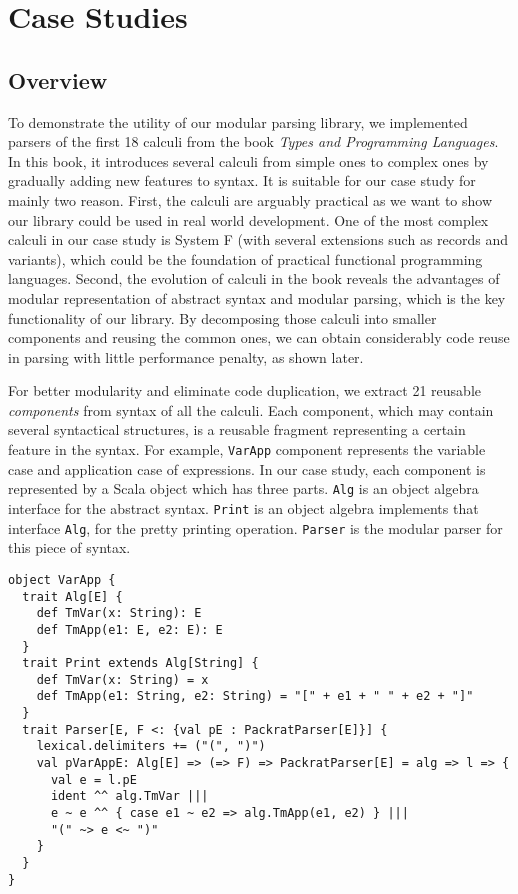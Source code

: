 \section{Case Studies}\label{sec:casestudy}

\subsection{Overview}\label{subsec:overview}

To demonstrate the utility of our modular parsing library, we implemented parsers of the first 18 calculi from the book \textit{Types and Programming Languages}. In this book, it introduces several calculi from simple ones to complex ones by gradually adding new features to syntax. It is suitable for our case study for mainly two reason. First, the calculi are arguably practical as we want to show our library could be used in real world development. One of the most complex calculi in our case study is System F (with several extensions such as records and variants), which could be the foundation of practical functional programming languages. Second, the evolution of calculi in the book reveals the advantages of modular representation of abstract syntax and modular parsing, which is the key functionality of our library. By decomposing those calculi into smaller components and reusing the common ones, we can obtain considerably code reuse in parsing with little performance penalty, as shown later.

For better modularity and eliminate code duplication, we extract 21 reusable \textit{components} from syntax of all the calculi. Each component, which may contain several syntactical structures, is a reusable fragment representing a certain feature in the syntax. For example, \lstinline{VarApp} component represents the variable case and application case of expressions. In our case study, each component is represented by a Scala object which has three parts. \lstinline{Alg} is an object algebra interface for the abstract syntax. \lstinline{Print} is an object algebra implements that interface \lstinline{Alg}, for the pretty printing operation. \lstinline{Parser} is the modular parser for this piece of syntax.

\begin{lstlisting}
object VarApp {
  trait Alg[E] {
    def TmVar(x: String): E
    def TmApp(e1: E, e2: E): E
  }
  trait Print extends Alg[String] {
    def TmVar(x: String) = x
    def TmApp(e1: String, e2: String) = "[" + e1 + " " + e2 + "]"
  }
  trait Parser[E, F <: {val pE : PackratParser[E]}] {
    lexical.delimiters += ("(", ")")
    val pVarAppE: Alg[E] => (=> F) => PackratParser[E] = alg => l => {
      val e = l.pE
      ident ^^ alg.TmVar |||
      e ~ e ^^ { case e1 ~ e2 => alg.TmApp(e1, e2) } |||
      "(" ~> e <~ ")"
    }
  }
}
\end{lstlisting}


